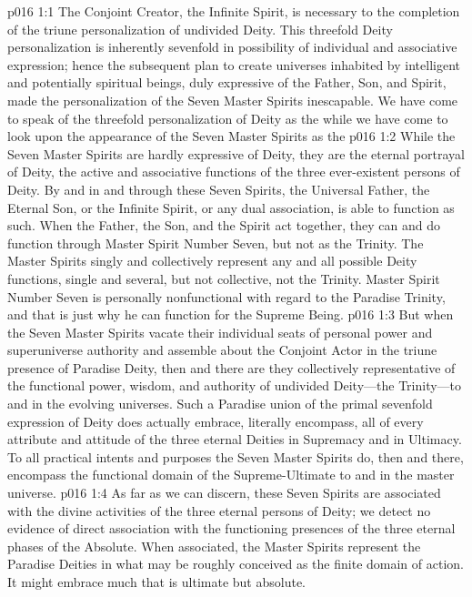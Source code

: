 \vs p016 1:1 The Conjoint Creator, the Infinite Spirit, is necessary to the completion of the triune personalization of undivided Deity. This threefold Deity personalization is inherently sevenfold in possibility of individual and associative expression; hence the subsequent plan to create universes inhabited by intelligent and potentially spiritual beings, duly expressive of the Father, Son, and Spirit, made the personalization of the Seven Master Spirits inescapable. We have come to speak of the threefold personalization of Deity as the  while we have come to look upon the appearance of the Seven Master Spirits as the 
\vs p016 1:2 While the Seven Master Spirits are hardly expressive of  Deity, they are the eternal portrayal of  Deity, the active and associative functions of the three ever\hyp{}existent persons of Deity. By and in and through these Seven Spirits, the Universal Father, the Eternal Son, or the Infinite Spirit, or any dual association, is able to function as such. When the Father, the Son, and the Spirit act together, they can and do function through Master Spirit Number Seven, but not as the Trinity. The Master Spirits singly and collectively represent any and all possible Deity functions, single and several, but not collective, not the Trinity. Master Spirit Number Seven is personally nonfunctional with regard to the Paradise Trinity, and that is just why he can function  for the Supreme Being.
\vs p016 1:3 But when the Seven Master Spirits vacate their individual seats of personal power and superuniverse authority and assemble about the Conjoint Actor in the triune presence of Paradise Deity, then and there are they collectively representative of the functional power, wisdom, and authority of undivided Deity---the Trinity---to and in the evolving universes. Such a Paradise union of the primal sevenfold expression of Deity does actually embrace, literally encompass, all of every attribute and attitude of the three eternal Deities in Supremacy and in Ultimacy. To all practical intents and purposes the Seven Master Spirits do, then and there, encompass the functional domain of the Supreme\hyp{}Ultimate to and in the master universe.
\vs p016 1:4 As far as we can discern, these Seven Spirits are associated with the divine activities of the three eternal persons of Deity; we detect no evidence of direct association with the functioning presences of the three eternal phases of the Absolute. When associated, the Master Spirits represent the Paradise Deities in what may be roughly conceived as the finite domain of action. It might embrace much that is ultimate but  absolute.\plusone
